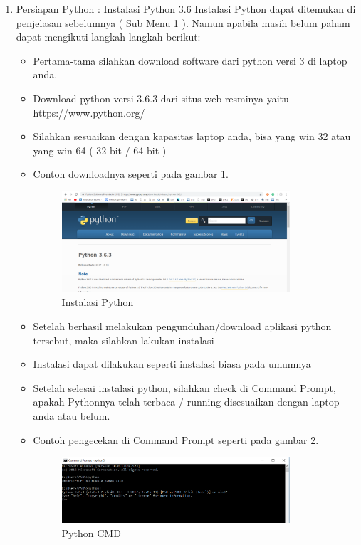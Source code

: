 \begin{enumerate}
\item Persiapan Python : Instalasi Python 3.6
Instalasi Python dapat ditemukan di penjelasan sebelumnya ( Sub Menu 1 ). Namun apabila masih belum paham dapat mengikuti langkah-langkah berikut:
\begin{itemize}
\item Pertama-tama silahkan download software dari python versi 3 di laptop anda.
\item Download python versi 3.6.3 dari situs web resminya yaitu https://www.python.org/
\item Silahkan sesuaikan dengan kapasitas laptop anda, bisa yang win 32 atau yang win 64 ( 32 bit / 64 bit )
\item Contoh downloadnya seperti pada gambar \ref{fig:inspy}.
\begin{figure}[!htbp]
	\centerline{\includegraphics[width=0.85\textwidth]{figures/10/inspy.PNG}}
	\caption{Instalasi Python}
	\label{fig:inspy}
\end{figure}

\item Setelah berhasil melakukan pengunduhan/download aplikasi python tersebut, maka silahkan lakukan instalasi
\item Instalasi dapat dilakukan seperti instalasi biasa pada umumnya
\item Setelah selesai instalasi python, silahkan check di Command Prompt, apakah Pythonnya telah terbaca / running disesuaikan dengan laptop anda atau belum.
\item Contoh pengecekan di Command Prompt seperti pada gambar \ref{fig:pyc}.
\begin{figure}[!htbp]
	\centerline{\includegraphics[width=0.85\textwidth]{figures/10/pyc.PNG}}
	\caption{Python CMD}
	\label{fig:pyc}
\end{figure}


\end{itemize}
\end{enumerate}
